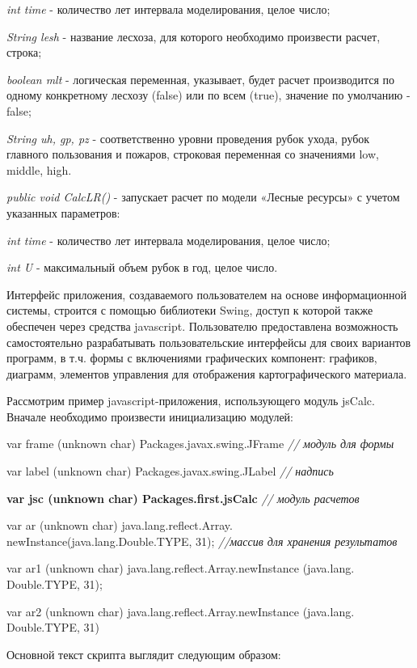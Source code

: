 \documentclass{article}
\begin{document}
\textit{int time} - количество лет интервала моделирования, 
целое число;

\textit{String lesh} - название лесхоза, для которого 
необходимо произвести расчет, строка;

\textit{boolean mlt} - логическая переменная, указывает, 
будет расчет производится по одному конкретному 
лесхозу (false) или по всем (true), значение по умолчанию 
- false;

\textit{String uh, gp, pz} - соответственно уровни проведения 
рубок ухода, рубок главного пользования и пожаров, 
строковая переменная со значениями low, middle, 
high.

\textit{public void CalcLR()} - запускает расчет по модели 
«Лесные ресурсы» с учетом указанных параметров:

\textit{int time} - количество лет интервала моделирования, 
целое число;

\textit{int U} - максимальный объем рубок в год, целое 
число.

Интерфейс приложения, создаваемого пользователем 
на основе информационной системы, строится 
с помощью библиотеки Swing, доступ к которой также 
обеспечен через средства javascript. Пользователю 
предоставлена возможность самостоятельно 
разрабатывать пользовательские интерфейсы 
для своих вариантов программ, в т.ч. формы с 
включениями графических компонент: графиков, 
диаграмм, элементов управления для отображения 
картографического материала.  

Рассмотрим пример javascript-приложения, использующего 
модуль jsCalc. Вначале необходимо произвести  
инициализацию модулей:

var frame (unknown char) Packages.javax.swing.JFrame    \textit{// модуль 
для формы}

var label (unknown char)  Packages.javax.swing.JLabel   \textit{// надпись}

\textbf{var jsc (unknown char) Packages.first.jsCalc   }\textit{// модуль 
расчетов}

var ar (unknown char) java.lang.reflect.Array. newInstance(java.lang.Double.TYPE, 
31);  \textit{//массив для хранения результатов}

var ar1 (unknown char) java.lang.reflect.Array.newInstance (java.lang. Double.TYPE, 
31);

var ar2 (unknown char) java.lang.reflect.Array.newInstance (java.lang. Double.TYPE, 
31)

Основной текст скрипта выглядит следующим 
образом:
\end{document}
